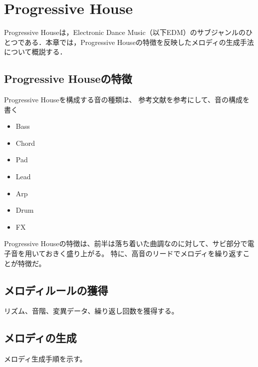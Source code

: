 \chapter{Progressive House}
Progressive Houseは，Electronic Dance Music（以下EDM）のサブジャンルのひとつである．本章では，Progressive Houseの特徴を反映したメロディの生成手法について概説する．

\section{Progressive Houseの特徴}
Progressive Houseを構成する音の種類は、
参考文献を参考にして、音の構成を書く
\begin{itemize}
  \item Bass
  \item Chord
  \item Pad
  \item Lead
  \item Arp
  \item Drum
  \item FX
\end{itemize}
Progressive Houseの特徴は、前半は落ち着いた曲調なのに対して、サビ部分で電子音を用いておきく盛り上がる。
特に、高音のリードでメロディを繰り返すことが特徴だ。

\section{メロディルールの獲得}
リズム、音階、変異データ、繰り返し回数を獲得する。

\section{メロディの生成}
メロディ生成手順を示す。
